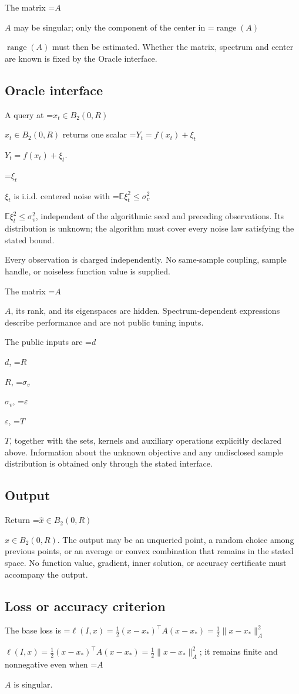 \documentclass[10pt,a4paper]{article}
\newcommand{\AtlasMath}[1]{\par\begingroup\centering\setbox0=\hbox{$\displaystyle #1$}\ifdim\wd0>1.4\linewidth\typeout{ATLAS WIDE FORMULA: \the\wd0}\fi\ifdim\wd0>\linewidth\resizebox{\linewidth}{!}{\box0}\else\box0\fi\par\endgroup}
\newcommand{\AtlasInlineMath}[1]{\begingroup\setbox0=\hbox{$#1$}\ifdim\wd0>.4\linewidth\endgroup\AtlasMath{#1}\else\endgroup$#1$\fi}
\begin{document}
The matrix \AtlasInlineMath{A} may be singular; only the component of the center in \AtlasInlineMath{\operatorname{range}(A)} must then be estimated. Whether the matrix, spectrum and center are known is fixed by the Oracle interface.

\subsection{Oracle interface}
A query at \AtlasInlineMath{x_t\in B_2(0,R)} returns one scalar \AtlasInlineMath{Y_t=f(x_t)+\xi_t}.

\AtlasInlineMath{\xi_t} is i.i.d. centered noise with \AtlasInlineMath{\mathbb{E}\xi_t^2\le\sigma_v^2}, independent of the algorithmic seed and preceding observations. Its distribution is unknown; the algorithm must cover every noise law satisfying the stated bound.

Every observation is charged independently. No same-sample coupling, sample handle, or noiseless function value is supplied.

The matrix \AtlasInlineMath{A}, its rank, and its eigenspaces are hidden. Spectrum-dependent expressions describe performance and are not public tuning inputs.

The public inputs are \AtlasInlineMath{d}, \AtlasInlineMath{R}, \AtlasInlineMath{\sigma_v}, \AtlasInlineMath{\varepsilon}, \AtlasInlineMath{T}, together with the sets, kernels and auxiliary operations explicitly declared above. Information about the unknown objective and any undisclosed sample distribution is obtained only through the stated interface.

\subsection{Output}
Return \AtlasInlineMath{\widehat{x}\in B_2(0,R)}. The output may be an unqueried point, a random choice among previous points, or an average or convex combination that remains in the stated space. No function value, gradient, inner solution, or accuracy certificate must accompany the output.

\subsection{Loss or accuracy criterion}
The base loss is \AtlasInlineMath{\ell(I,x)=\frac12(x-x_*)^\top A(x-x_*)=\frac12\|x-x_*\|_A^2}; it remains finite and nonnegative even when \AtlasInlineMath{A} is singular.
\end{document}
